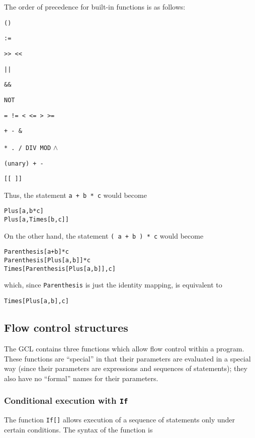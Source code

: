 The order of precedence for built-in functions is as follows:
\bd
\item
\verb+()+
\item
\verb+:=+
\item
\verb+>> <<+
\item
\verb+||+
\item
\verb+&&+
\item
\verb+NOT+
\item
\verb+= != < <= > >=+
\item
\verb&+ - &\verb+&+
\item
\verb+* . / DIV MOD+ $\wedge$
\item
\verb&(unary) + -&
\item
\verb+[[ ]]+
\ed

Thus, the statement \verb&a + b * c& would become 
\begin{verbatim}
Plus[a,b*c]
Plus[a,Times[b,c]]
\end{verbatim}

\noindent
On the other hand, the statement \verb&( a + b ) * c& would become 
\begin{verbatim}
Parenthesis[a+b]*c
Parenthesis[Plus[a,b]]*c
Times[Parenthesis[Plus[a,b]],c]
\end{verbatim}

\noindent
which, since \verb+Parenthesis+ is just the identity mapping, is
equivalent to
\begin{verbatim}
Times[Plus[a,b],c]
\end{verbatim}

\medskip

\subsection{Flow control structures}

The GCL contains three functions which allow flow control within a
program.  These functions are ``special'' in that their parameters are
evaluated in a special way (since their parameters are expressions and
sequences of statements); they also have no ``formal'' names for their
parameters.

\subsubsection{Conditional execution with {\tt If}}

The function \verb+If[]+ allows execution of a sequence of statements
only under certain conditions.  The syntax of the function is

